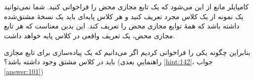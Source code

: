 \section{}
\paragraph{}\label{hint:237}
کامپایلر مانع از این می‌شود که یک تابع مجازی محض را فراخوانی کنید. شما نمی‌توانید یک نمونه از یک کلاس مجرد تعریف کنید و هر کلاس پایه‌ای باید یک نسخهٔ مشتق‌شده داشته باشد که همهٔ توابع مجازی محض را تعریف کند. این بدین معناست که هر تابع مجازی محض، یک تعریف واقعی در کلاس پایه خواهد داشت.

بنابراین چگونه یکی را فراخوانی کردیم اگر می‌دانیم که یک پیاده‌سازی برای تابع مجازی باید در کلاس مشتق وجود داشته باشد؟ (راهنماییِ بعدی \ref{hint:142}، جواب \ref{answer:101})